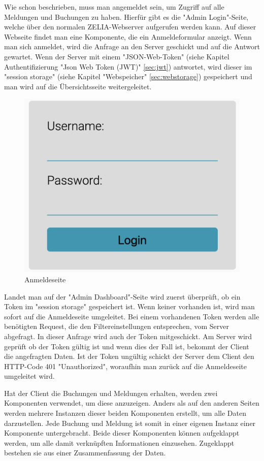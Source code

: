 Wie schon beschrieben, muss man angemeldet sein, um Zugriff auf alle Meldungen und Buchungen zu haben. Hierfür gibt es die "Admin Login"-Seite, welche über den normalen ZELIA-Webserver aufgerufen werden kann. Auf dieser Webseite findet man eine Komponente, die ein Anmeldeformular anzeigt. Wenn man sich anmeldet, wird die Anfrage an den Server geschickt und auf die Antwort gewartet. Wenn der Server mit einem "JSON-Web-Token" (siehe Kapitel Authentifizierung "Json Web Token (JWT)" \ref{sec:jwt}) antwortet, wird dieser im "session storage" (siehe Kapitel "Webspeicher" \ref{sec:webstorage}) gespeichert und man wird auf die Übersichtsseite weitergeleitet.

\begin{figure}[H]
    \centering
    \includegraphics[width=120mm]{media/WebComponents/Login_light.png}
    \caption{Anmeldeseite}
\end{figure}

Landet man auf der "Admin Dashboard"-Seite wird zuerst überprüft, ob ein Token im "session storage" gespeichert ist. Wenn keiner vorhanden ist, wird man sofort auf die Anmeldeseite umgeleitet. Bei einem vorhandenen Token werden alle benötigten Request, die den Filtereinstellungen entsprechen, vom Server abgefragt. In dieser Anfrage wird auch der Token mitgeschickt. Am Server wird geprüft ob der Token gültig ist und wenn dies der Fall ist, bekommt der Client die angefragten Daten. Ist der Token ungültig schickt der Server dem Client den HTTP-Code 401 "Unauthorized", woraufhin man zurück auf die Anmeldeseite umgeleitet wird.

Hat der Client die Buchungen und Meldungen erhalten, werden zwei Komponenten verwendet, um diese anzuzeigen. Anders als auf den anderen Seiten werden mehrere Instanzen dieser beiden Komponenten erstellt, um alle Daten darzustellen. Jede Buchung und Meldung ist somit in einer eigenen Instanz einer Komponente untergebracht. Beide dieser Komponenten können aufgeklappt werden, um alle damit verknüpften Informationen einzusehen. Zugeklappt bestehen sie aus einer Zusammenfassung der Daten. 

